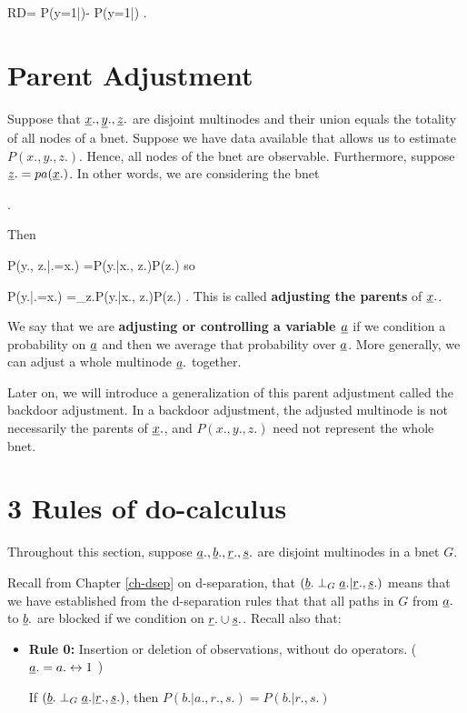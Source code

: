 \beq
RD=
P(y=1|)-
P(y=1|)
\;.
\eeq

\section*{Parent Adjustment}


Suppose 
that ${\underline{x}}., {\underline{y}}., {\underline{z}}.$
are disjoint multinodes
and their union equals
 the
totality of all nodes of
a bnet. 
Suppose we have data
available that allows us  to
estimate $P(x., y., z.)$.
Hence, all nodes of the bnet
are observable.
Furthermore,
suppose ${\underline{z}}.=pa({\underline{x}}.)$.
In other words,
we are 
considering the bnet

\beq
{}
\;.
\eeq

Then

\beq
P(y., z.|\rho \rvx.=x.)
=P(y.|x., z.)P(z.)
\eeq
so

\beq
P(y.|\rho \rvx.=x.)
=\sum_{z.}P(y.|x., z.)P(z.)
\;.
\eeq
This is called
{\bf adjusting the parents}
of ${\underline{x}}.$.


We say that 
we are {\bf adjusting 
or controlling a variable ${\underline{a}}$}
if we condition 
a probability on ${\underline{a}}$ and 
then we average 
that probability over ${\underline{a}}$.
More generally, 
we can adjust a whole
multinode ${\underline{a}}.$ together.

Later on,
we will introduce 
a generalization
of 
this parent adjustment
called the 
backdoor adjustment.
In a backdoor adjustment,
the adjusted multinode
is not necessarily
 the parents of ${\underline{x}}.$, 
and $P(x., y., z.)$
need not represent the
whole bnet.



\section*{3 Rules of do-calculus}
Throughout 
this section, suppose
${\underline{a}}., {\underline{b}}., {\underline{r}}., 
{\underline{s}}.$ are disjoint
multinodes in a bnet $G$.


Recall
from Chapter \ref{ch-dsep}
on d-separation,
that  $({\underline{b}}.\perp_G {\underline{a}}.|{\underline{r}}., {\underline{s}}.)$
means that 
we have established
from the d-separation
rules that 
that all 
paths in $G$
 from
${\underline{a}}.$ to
${\underline{b}}.$
are blocked
if we condition
on ${\underline{r}}.\cup {\underline{s}}.$.
Recall also that:

\begin{itemize}
\item {\bf Rule 0:} Insertion or
 deletion of
 observations, without
do operators.
(${\underline{a}}.=a. \leftrightarrow 1$ )


If 
 $({\underline{b}}.\perp_G {\underline{a}}.|{\underline{r}}.,
{\underline{s}}.)$, then
$P(b.|a., r., s.)=P(b.|r., s.)$
\end{itemize}


